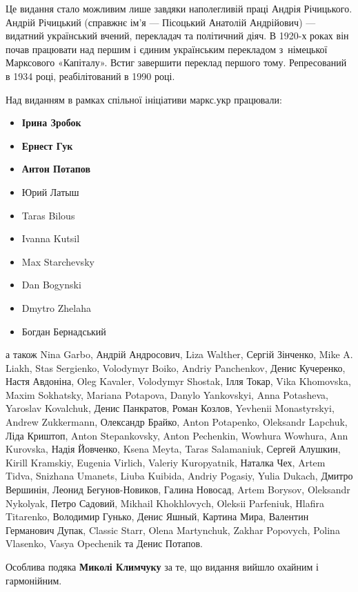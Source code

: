 
Це видання стало можливим лише завдяки наполегливій праці Андрія Річицького. Андрій Річицький (справжнє ім'я — Пісоцький Анатолій Андрійович) — видатний український вчений, перекладач та політичний діяч. В 1920-х роках він почав працювати над першим і єдиним українським перекладом з~німецької Марксового «Капіталу». Встиг завершити переклад першого тому. Репресований в 1934 році, реабілітований в 1990 році. 

Над виданням в рамках спільної ініціативи маркс.укр працювали:
\begin{itemize}[nosep]
\item \textbf{Ірина Зробок}
\item \textbf{Ернест Гук}
\item \textbf{Антон Потапов}
\item Юрий Латыш
\item Taras Bilous
\item Ivanna Kutsil
\item Max Starchevsky
\item Dan Bogynski
\item Dmytro Zhelaha
\item Богдан Бернадський
\end{itemize}
\noindent{}а також Nina Garbo, Андрій Андросович, Liza Walther, Сергій Зінченко,
Mike A. Liakh, Stas Sergienko, Volodymyr Boiko, Andriy Panchenkov, Денис Кучеренко, Настя Авдоніна, Oleg Kavaler, Volodymyr Shostak, Ілля Токар, Vika Khomovska, Maxim Sokhatsky, Mariana Potapova, Danylo Yankovskyi, Anna Potasheva, Yaroslav Kovalchuk, Денис Панкратов, Роман Козлов, \textenglish{Yevhenii Mo\-nas\-tyr\-skyi}, Andrew Zukkermann, Олександр Брайко, Anton Potapenko, Oleksandr Lapchuk, Ліда Криштоп, Anton Stepankovsky, Anton Pechenkin, Wowhura Wowhura, Ann Kurovska, Надія Йовченко, Ksena Meyta, Taras Salamaniuk, Сергей Алушкин, Kirill Kramskiy, Eugenia Virlich, Valeriy Kuropyatnik, Наталка Чех, Artem Tidva, Snizhana Umanets, Liuba Kuibida, Andriy Pogasiy, Yulia Dukach, Дмитро Вершинін, Леонид Бегунов-Новиков, Галина Новосад, Artem Borysov, Oleksandr Nykolyak, Петро Садовий, Mikhail Khokhlovych, Oleksii Parfeniuk, Hlafira Titarenko, Володимир Гунько, Денис Яшный, Картина Мира, Валентин Германович Дупак, Classic Starr, Olena Martynchuk, Zakhar Popovych, Polina Vlasenko, Vasya Opechenik та Денис Потапов.

\smallskip
\noindent{}Особлива подяка \textbf{Миколі Климчуку} за те,
що видання вийшло охайним і гармонійним. 

\cleardoublepage